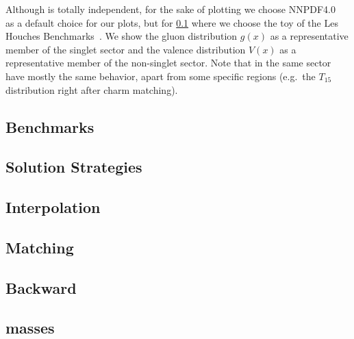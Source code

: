 Although \eko{} is totally \pdf{} independent, for the sake of plotting
we choose NNPDF4.0~\cite{NNPDF:2021njg} as a default choice for
our plots, but for \cref{sec:eko/pheno-bench} where we choose the toy \pdf{} of the
Les Houches Benchmarks~\cite{Giele:2002hx,Dittmar:2005ed}.
We show the gluon distribution $g(x)$ as a
representative member of the singlet sector and the valence distribution $V(x)$
as a representative member of the non-singlet sector.
Note that \pdfs in the same sector have mostly the same behavior, apart from
some specific regions (e.g.\ the $T_{15}$ distribution right after charm
matching).

\subsection{Benchmarks}
\label{sec:eko/pheno-bench}


\subsection{Solution Strategies}
\label{sec:eko/pheno-sols}


\subsection{Interpolation}
\label{sec:eko/pheno-interp}


\subsection{Matching}
\label{sec:eko/pheno-match}


\subsection{Backward}
\label{sec:eko/pheno-back}


\subsection{\msbar{} masses}
\label{sec:eko/pheno-msbarmass}


